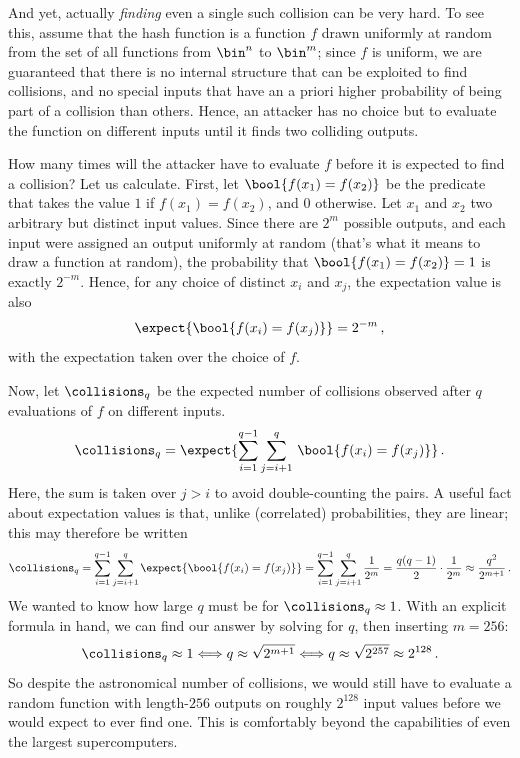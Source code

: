     And yet, actually \emph{finding} even a single such collision can be very
      hard. To see this, assume that the hash function is a function
      $f$ drawn uniformly at random from the set of all functions from $\bin^n$ to
      $\bin^m$; since $f$ is uniform, we are guaranteed that there is no
      internal structure that can be exploited to find collisions, and no
      special inputs that have an a priori
      higher probability of being part of a collision than others. 
      Hence, an attacker has no choice but to
      evaluate the function on different inputs until it finds two colliding
      outputs. 

    How many times will the attacker have to evaluate $f$ before it is expected
      to find a collision?
      Let us calculate. First, let $\bool{f(x_1) = f(x_2)}$ be the predicate that
      takes the value $1$ if $f(x_1) = f(x_2)$, and $0$ otherwise.
      Let $x_1$ and $x_2$ two arbitrary but distinct input values.
      Since there are $2^m$ possible outputs, and each input were assigned an
      output uniformly at random (that's what it means to draw a function at random), 
      the probability that $\bool{f(x_1) = f(x_2)} = 1$
      is exactly $2^{-m}$. Hence, for any choice of distinct $x_i$ and $x_j$, 
      the expectation value is also
      \[
        \expect{\bool{f(x_i) = f(x_j)}} = 2^{-m}\, ,
      \]
      with the expectation taken over the choice of $f$.

    Now, let $\collisions_q$ be the expected number of
      collisions observed after $q$ evaluations of $f$ on different inputs.
      \[
        \collisions_q = \expect{\sum_{i = 1}^{q-1} \sum_{j = i+1}^q\, \bool{f(x_i) = f(x_j)}}\, .
      \]
      Here, the sum is taken over $j > i$ to avoid double-counting the pairs. A useful
      fact about expectation values is
      that, unlike (correlated) probabilities, they are linear; this may
      therefore be written
      \[
        \collisions_q 
          = \sum_{i = 1}^{q-1} \sum_{j = i+1}^q
            \expect{\bool{f(x_i) = f(x_j)}} 
          = \sum_{i = 1}^{q-1} \sum_{j = i+1}^q \frac{1}{2^m} 
          = \frac{q(q-1)}{2} \cdot \frac{1}{2^m} 
          \approx \frac{q^2}{2^{m+1}}\, .
      \]
      We wanted to know how large $q$ must be for $\collisions_q \approx 1$.
      With an explicit formula in hand, we can find our answer by solving for
      $q$, then inserting $m = 256$:
      \[
        \collisions_q \approx 1 
        \Longleftrightarrow q \approx \sqrt{2^{m+1}} 
        \Longleftrightarrow q \approx \sqrt{2^{257}} \approx 2^{128}\, .
      \]
      So despite the astronomical number of collisions, we would still 
      have to evaluate a random function with length-$256$ outputs on roughly
      $2^{128}$ input values before we would expect to ever find one.
      This is comfortably beyond the capabilities of even the largest
      supercomputers.

